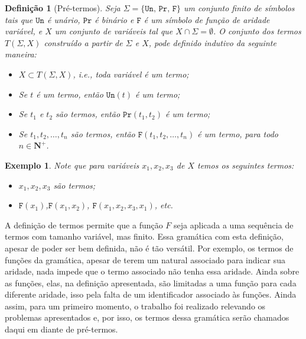 \documentclass{article}
\newtheorem{definicao}{Definição}
\newtheorem{exemplo}{Exemplo}
\begin{document}
\begin{definicao}[Pré-termos]
	Seja $\Sigma=\{\texttt{Un, Pr, F}\}$ um conjunto finito de símbolos tais que $\texttt{Un}$ é unário, $\texttt{Pr}$ é binário e $\texttt{F}$ é um símbolo de função de aridade variável, e $X$ um conjunto de variáveis tal que $X \cap \Sigma = \emptyset$.  O conjunto dos termos $T(\Sigma, X)$ construído a partir de $\Sigma$ e $X$, pode definido indutivo da seguinte maneira:

	\begin{itemize}
		\item $X \subset T(\Sigma, X)$, i.e., toda variável é um termo;
		\item Se $t$ é um termo, então $\texttt{Un}(t)$ é um termo;
		\item Se $t_1$ e $t_2$ são  termos, então $\texttt{Pr}(t_1, t_2)$ é um termo;
	 	\item Se $t_1, t_2, \ldots, t_n$ são  termos, então $\texttt{F}(t_1,t_2,\ldots, t_n)$ é um
			 termo, para todo $n \in \mathbf{N}^+$.
	\end{itemize}
	\label{definicao:pre-termos}
\end{definicao}

\begin{exemplo}
	Note que para variáveis $x_1,x_2,x_3$ de $X$ temos os seguintes termos:

	\begin{itemize}
		\item $x_1, x_2, x_3$ são termos;
		\item $\texttt{F}(x_1)$,$\texttt{F}(x_1, x_2)$, $\texttt{F}(x_1, x_2, x_3, x_1)$, etc.
	\end{itemize}
	\label{exemplo:pre-termos}
\end{exemplo}

A definição de termos permite que a função $F$ seja aplicada a uma sequência de termos com tamanho variável, mas finito.  Essa gramática com esta definição, apesar de poder ser bem definida, não é tão versátil. Por exemplo, os termos de funções da gramática, apesar de terem um natural associado para indicar sua aridade, nada impede que o termo associado não tenha essa aridade. Ainda sobre as funções, elas, na definição apresentada, são limitadas a uma função para cada diferente aridade, isso pela falta de um identificador associado às funções. Ainda assim, para um primeiro momento, o trabalho foi realizado relevando os problemas apresentados e, por isso, os termos dessa gramática serão chamados daqui em diante de pré-termos.
\end{document}
